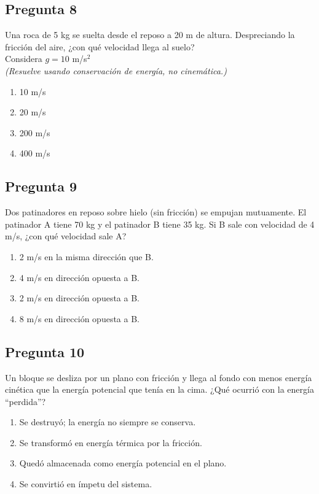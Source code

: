 \begin{preguntabox}
\subsection{Pregunta 8}
Una roca de 5 kg se suelta desde el reposo a 20 m de altura. Despreciando la fricción del aire, ¿con qué velocidad llega al suelo?\\
Considera $g = 10$ m/s$^2$\\
\textit{(Resuelve usando conservación de energía, no cinemática.)}

\begin{enumerate}
    \item[A)] 10 m/s
    \item[B)] 20 m/s
    \item[C)] 200 m/s
    \item[D)] 400 m/s
\end{enumerate}
\end{preguntabox}

\begin{preguntabox}
\subsection{Pregunta 9}
Dos patinadores en reposo sobre hielo (sin fricción) se empujan mutuamente. El patinador A tiene 70 kg y el patinador B tiene 35 kg. Si B sale con velocidad de 4 m/s, ¿con qué velocidad sale A?

\begin{enumerate}
    \item[A)] 2 m/s en la misma dirección que B.
    \item[B)] 4 m/s en dirección opuesta a B.
    \item[C)] 2 m/s en dirección opuesta a B.
    \item[D)] 8 m/s en dirección opuesta a B.
\end{enumerate}
\end{preguntabox}

\begin{preguntabox}
\subsection{Pregunta 10}
Un bloque se desliza por un plano con fricción y llega al fondo con menos energía cinética que la energía potencial que tenía en la cima. ¿Qué ocurrió con la energía ``perdida''?

\begin{enumerate}
    \item[A)] Se destruyó; la energía no siempre se conserva.
    \item[B)] Se transformó en energía térmica por la fricción.
    \item[C)] Quedó almacenada como energía potencial en el plano.
    \item[D)] Se convirtió en ímpetu del sistema.
\end{enumerate}
\end{preguntabox}


